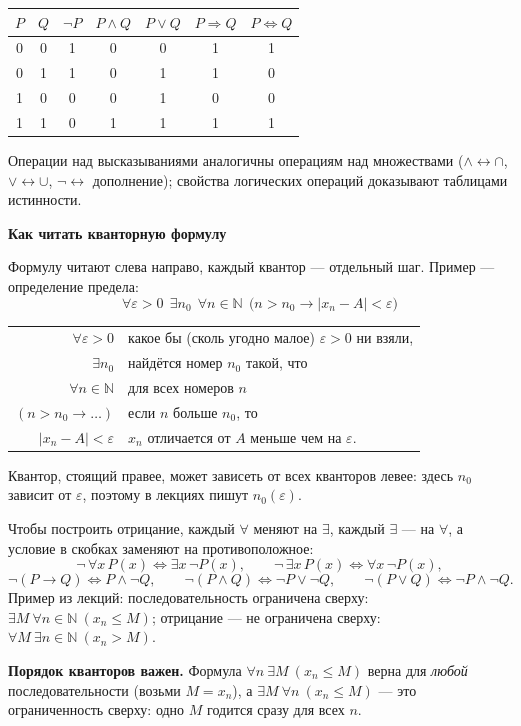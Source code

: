 \documentclass[a4paper,11pt]{article}
\newcommand{\N}{\mathbb{N}}
\newcommand{\eps}{\varepsilon}
\newcommand{\podr}[1]{\par\needspace{8\baselineskip}\medskip
  {\large\bfseries\textcolor{oprc!80!black}{#1}}\par\nopagebreak\smallskip}
\begin{document}
\begin{center}
\renewcommand{\arraystretch}{1.15}
\begin{tabular}{|c|c||c|c|c|c|c|}
\hline
$P$ & $Q$ & $\neg P$ & $P \wedge Q$ & $P \vee Q$ & $P \Rightarrow Q$ & $P \Leftrightarrow Q$ \\ \hline
0 & 0 & 1 & 0 & 0 & 1 & 1 \\
0 & 1 & 1 & 0 & 1 & 1 & 0 \\
1 & 0 & 0 & 0 & 1 & 0 & 0 \\
1 & 1 & 0 & 1 & 1 & 1 & 1 \\ \hline
\end{tabular}
\end{center}

Операции над высказываниями аналогичны операциям над множествами
($\wedge \leftrightarrow \cap$, $\vee \leftrightarrow \cup$, $\neg \leftrightarrow$ дополнение);
свойства логических операций доказывают таблицами истинности.

\podr{Как читать кванторную формулу}

Формулу читают слева направо, каждый квантор --- отдельный шаг. Пример --- определение предела:
\[
  \forall \eps > 0\ \ \exists n_0\ \ \forall n \in \N\ \ \bigl(n > n_0 \to |x_n - A| < \eps\bigr)
\]
\begin{center}
\renewcommand{\arraystretch}{1.2}
\begin{tabular}{r@{\quad---\quad}l}
$\forall \eps > 0$ & какое бы (сколь угодно малое) $\eps > 0$ ни взяли, \\
$\exists n_0$ & найдётся номер $n_0$ такой, что \\
$\forall n \in \N$ & для всех номеров $n$ \\
$(n > n_0 \to \dots)$ & если $n$ больше $n_0$, то \\
$|x_n - A| < \eps$ & $x_n$ отличается от $A$ меньше чем на $\eps$.
\end{tabular}
\end{center}
Квантор, стоящий правее, может зависеть от всех кванторов левее: здесь $n_0$ зависит от $\eps$,
поэтому в лекциях пишут $n_0(\eps)$.

\begin{dop}
Чтобы построить отрицание, каждый $\forall$ меняют на $\exists$, каждый $\exists$ --- на $\forall$,
а условие в скобках заменяют на противоположное:
\[
  \neg\,\forall x\, P(x) \Leftrightarrow \exists x\, \neg P(x), \qquad
  \neg\,\exists x\, P(x) \Leftrightarrow \forall x\, \neg P(x),
\]
\[
  \neg(P \to Q) \Leftrightarrow P \wedge \neg Q, \qquad
  \neg(P \wedge Q) \Leftrightarrow \neg P \vee \neg Q, \qquad
  \neg(P \vee Q) \Leftrightarrow \neg P \wedge \neg Q.
\]
Пример из лекций: последовательность ограничена сверху: $\exists M\ \forall n \in \N\ (x_n \le M)$;
отрицание --- не ограничена сверху: $\forall M\ \exists n \in \N\ (x_n > M)$.

\textbf{Порядок кванторов важен.} Формула $\forall n\ \exists M\ (x_n \le M)$ верна для \emph{любой}
последовательности (возьми $M = x_n$), а $\exists M\ \forall n\ (x_n \le M)$ --- это ограниченность
сверху: одно $M$ годится сразу для всех $n$.
\end{dop}
\end{document}
